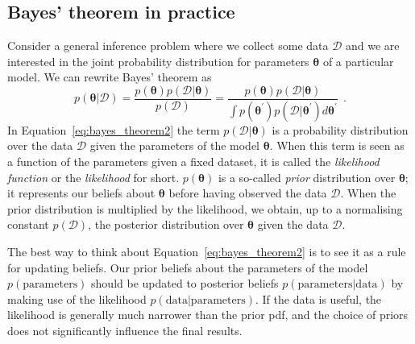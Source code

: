 \documentclass[12pt,dvipsnames]{report}
\renewcommand{\vec}[1]{\boldsymbol{\mathbf{#1}}}
\newcommand{\hquad}{~~}
\begin{document}
\subsection{Bayes' theorem in practice}
\label{ssec:likelihood_function}
Consider a general inference problem where we collect some data $\mathcal{D}$ and we are interested
in the joint probability distribution for parameters $\boldsymbol\theta$ of a particular model.
We can rewrite Bayes' theorem as
\begin{equation}
    p(\vec{\theta} | \mathcal{D})=\frac{p(\vec{\theta}) p(\mathcal{D} | \vec{\theta})}{p(\mathcal{D})}=\frac{p(\vec{\theta}) p(\mathcal{D} | \vec{\theta})}{\int p\left(\vec{\theta}^{\prime}\right) p\left(\mathcal{D} |\vec{\theta}^{\prime}\right) d \vec{\theta}^{\prime}}
    \hquad.
    \label{eq:bayes_theorem2}
\end{equation}
In Equation~\ref{eq:bayes_theorem2} the term $p(\mathcal{D}|\vec{\theta})$  is a probability
distribution over the data $\mathcal{D}$ given the parameters of the model $\vec{\theta}$.
When this term is seen as a function of the parameters given a fixed dataset, it is
called the \emph{likelihood function }  or the \emph{likelihood} for short. $p(\boldsymbol\theta)$
is a so-called \emph{prior} distribution over $\vec{\theta}$; it represents our beliefs
about $\vec{\theta}$ before having observed the data $\mathcal{D}$. When the prior distribution is
multiplied by the likelihood, we obtain, up to a normalising constant $p(\mathcal{D})$, the posterior
distribution over $\vec{\theta}$ given the data $\mathcal{D}$.

The best way to think about Equation~\ref{eq:bayes_theorem2} is to see it as a rule
for updating beliefs. Our prior beliefs about the parameters of the model
$p(\mathrm{parameters})$ should be updated to posterior beliefs $
    p(\mathrm{parameters} | \mathrm{data})$ by making use of the likelihood
$p(\mathrm{data} | \mathrm{parameters})$. If the data is useful, the likelihood is generally
much narrower than the prior pdf, and the choice of priors does not significantly
influence the final results.
\end{document}
